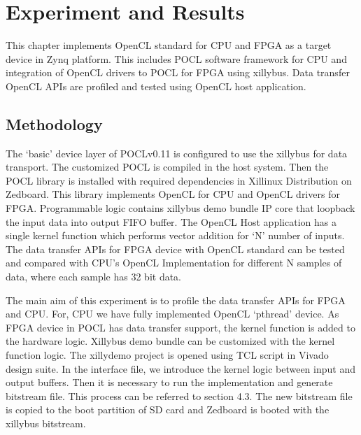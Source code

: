 \chapter{Experiment and Results}
\label{ch5_Experiment_and_Results}

This chapter implements OpenCL standard for CPU and FPGA as a target device in Zynq platform. This includes POCL software framework for CPU and integration of OpenCL drivers to POCL for FPGA using xillybus. Data transfer OpenCL APIs are profiled and tested using OpenCL host application.

\section{Methodology}
The ‘basic’ device layer of POCLv0.11 is configured to use the xillybus for data transport. The customized POCL is compiled in the host system. Then the POCL library is installed with required dependencies in Xillinux Distribution on Zedboard. This library implements OpenCL for CPU and OpenCL drivers for FPGA. Programmable logic contains xillybus demo bundle IP core that loopback the input data into output FIFO buffer. The OpenCL Host application has a single kernel function which performs vector addition for ‘N’ number of inputs. The data transfer APIs for FPGA device with OpenCL standard can be tested and compared with CPU's OpenCL Implementation for different N samples of data, where each sample has 32 bit data.

The main aim of this experiment is to profile the data transfer APIs for FPGA and CPU. For, CPU we have fully implemented OpenCL ‘pthread’ device. As FPGA device in POCL has data transfer support, the kernel function is added to the hardware logic. Xillybus demo bundle can be customized with the kernel function logic. The xillydemo project is opened using TCL script in Vivado design suite. In the interface file, we introduce the kernel logic between input and output buffers. Then it is necessary to run the implementation and generate bitstream file. This process can be referred to section 4.3. The new bitstream file is copied to the boot partition of SD card and Zedboard is booted with the xillybus bitstream.
 
